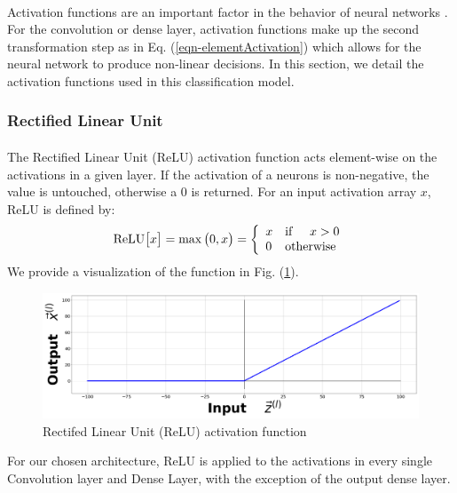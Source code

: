 \documentclass[12pt,letterpaper]{article}
\begin{document}
\paragraph*{}Activation functions are an important factor in the behavior of neural networks \cite{Geron}. For the convolution or dense layer, activation functions make up the second transformation step as in Eq. (\ref{eqn-elementActivation}) which allows for the neural network to produce non-linear decisions. In this section, we detail the activation functions used in this classification model.

\subsubsection{Rectified Linear Unit}

\paragraph*{}The Rectified Linear Unit (ReLU) activation function acts element-wise on the activations in a given layer. If the activation of a neurons is non-negative, the value is untouched, otherwise a $0$ is returned. For an input activation array $x$, ReLU is defined by:
\begin{equation}
\label{eqn-ReLU}
\text{ReLU}\big[x\big] = \max\big(0,x\big) = \left\{
\begin{array}{ll}
    x & \text{if\hspace{0.5cm}} x > 0 \\
    0 & \text{otherwise}
\end{array} 
\right.
\end{equation}
We provide a visualization of the function in Fig. (\ref{fig-ReLU}).
\begin{figure}[H]
\begin{center}
\includegraphics[scale=0.25]{../Figures/RectifiedLinearUnit}
\end{center}
\caption{Rectifed Linear Unit (ReLU) activation function}
\label{fig-ReLU}
\end{figure}
For our chosen architecture, ReLU is applied to the activations in every single Convolution layer and Dense Layer, with the exception of the output dense layer.
\end{document}
